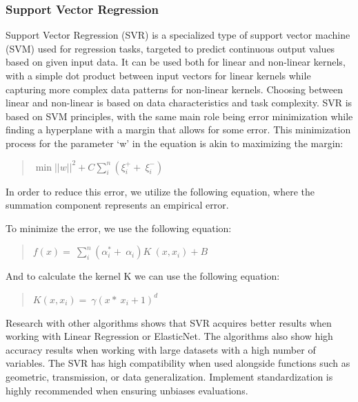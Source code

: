 \subsubsection{Support Vector Regression}
Support Vector Regression (SVR) is a specialized type of support vector machine (SVM) used for regression tasks, targeted to predict continuous output values based on given input data. It can be used both for linear and non-linear kernels, with a simple dot product between input vectors for linear kernels while capturing more complex data patterns for non-linear kernels. Choosing between linear and non-linear is based on data characteristics and task complexity. SVR is based on SVM principles, with the same main role being error minimization while finding a hyperplane with a margin that allows for some error. 
This minimization process for the parameter ‘w’ in the equation is akin to maximizing the margin:
\begin{quote}
    \({\min\left| |w| \right|}^{2} + C\sum_{i}^{n}(\xi_{i}^{+} + \ \xi_{i}^{-})\ \ \)
\end{quote}

In order to reduce this error, we utilize the following equation, where the summation component represents an empirical error. 


To minimize the error, we use the following equation:
\begin{quote}
    \(f(x) = \ \sum_{i}^{n}\left( \alpha_{i}^{*} + \ \alpha_{i} \right)K\ \left( x,x_{i} \right) + B\)
\end{quote}
And to calculate the kernel K we can use the following equation: 

\begin{quote}
    \(K\left( x,x_{i} \right) = \ \gamma\left( x*\ x_{i} + 1 \right)^{d}\ \)

\end{quote}

Research with other algorithms shows that SVR acquires better results when working with Linear Regression or ElasticNet. The algorithms also show high accuracy results when working with large datasets with a high number of variables. The SVR has high compatibility when used alongside functions such as geometric, transmission, or data generalization.  Implement standardization is highly recommended when ensuring unbiases evaluations.

